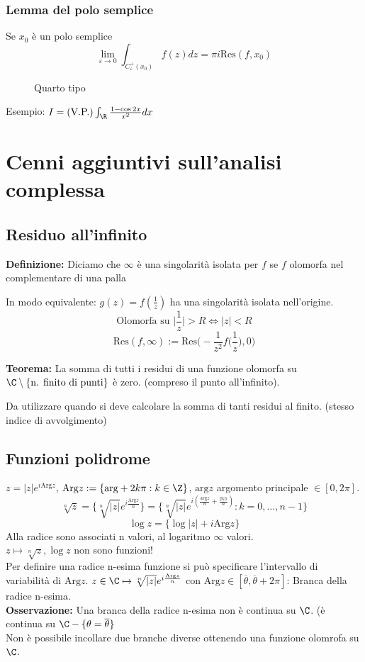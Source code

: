 \subsubsection{Lemma del polo semplice}
Se $x_0$ è un polo semplice
\[\lim_{\varepsilon \to 0} \int_{C_\varepsilon^+(x_0)}^{} f(z)dz=\pi i \text{Res}(f,x_0)\] 
\begin{figure}[ht]
    \centering
    \caption{Quarto tipo}
    \label{fig:quarto-tipo}
\end{figure}
Esempio: $I=\text{(V.P.)}\int_{\R}^{} \frac{1-\cos 2x}{x^2}dx$
\section{Cenni aggiuntivi sull'analisi complessa}
\subsection{Residuo all'infinito}
\begin{tcolorbox}
	\textbf{Definizione:} Diciamo che $\infty$ è una singolarità isolata per $f$ se $f$ olomorfa nel complementare di una palla
\end{tcolorbox}
In modo equivalente: $g(z)=f(\frac{1}{z})$ ha una singolarità isolata nell'origine.
\[\text{Olomorfa su }\bigg|\frac{1}{z}\bigg|>R\iff |z|<R\]
\[\text{Res}(f,\infty):=\text{Res}\bigg(-\frac{1}{z^2}f\bigg(\frac{1}{z}\bigg),0\bigg)\]
\begin{tcolorbox}
	\textbf{Teorema:} La somma di tutti i residui di una funzione olomorfa su $\C\setminus \{\text{n. finito di punti}\} $ è zero. (compreso il punto all'infinito).
\end{tcolorbox}
Da utilizzare quando si deve calcolare la somma di tanti residui al finito. (stesso indice di avvolgimento)
\subsection{Funzioni polidrome}
$z=|z|e^{i\text{Arg}z}$, $\text{Arg}z:=\{\text{arg}+2k\pi:k\in\Z\} $, $\text{arg}z$ argomento principale $\in[0,2\pi]$.
\[\sqrt[n]{z}=\{\sqrt[n]{|z|}e^{i \frac{\text{Arg}z}{n}} \}=\{\sqrt[n]{|z|}e^{i( \frac{\text{arg}z}{n}+ \frac{2k\pi}{n})}:k=0,\ldots,n-1 \} \]
\[\log z=\{\log |z|+i\text{Arg}z\}\]
Alla radice sono associati n valori, al logaritmo $\infty$ valori.
\\$z \mapsto \sqrt[n]{z},\log z$ non sono funzioni!
\\Per definire una radice n-esima funzione si può specificare l'intervallo di variabilità di $\text{Arg}z$.
$z\in\C\mapsto \sqrt[n]{|z|} e^{i \frac{\text{Arg}z}{n}}$ con $\text{Arg}z\in[\overline \theta,\overline\theta+2\pi]$: Branca della radice n-esima.
\\\textbf{Osservazione:} Una branca della radice n-esima non è continua su $\C$. (è continua su $\C-\{\theta=\overline\theta\}$
\\Non è possibile incollare due branche diverse ottenendo una funzione olomrofa su $\C$.

